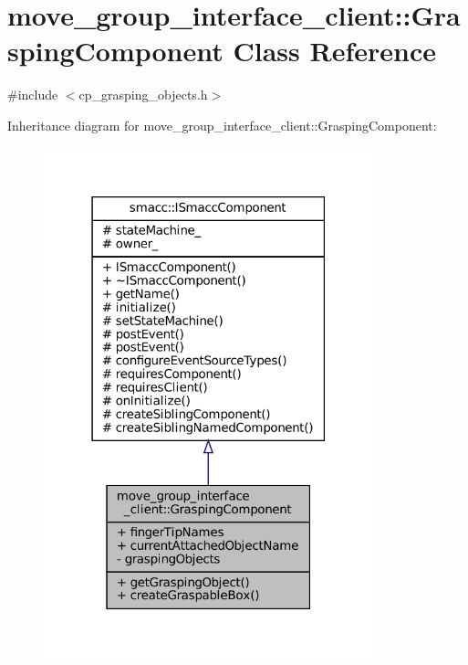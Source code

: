 \hypertarget{classmove__group__interface__client_1_1GraspingComponent}{}\section{move\+\_\+group\+\_\+interface\+\_\+client\+:\+:Grasping\+Component Class Reference}
\label{classmove__group__interface__client_1_1GraspingComponent}


{\ttfamily \#include $<$cp\+\_\+grasping\+\_\+objects.\+h$>$}



Inheritance diagram for move\+\_\+group\+\_\+interface\+\_\+client\+:\+:Grasping\+Component\+:
\nopagebreak
\begin{figure}[H]
\begin{center}
\leavevmode
\includegraphics[width=271pt]{classmove__group__interface__client_1_1GraspingComponent__inherit__graph}
\end{center}
\end{figure}


